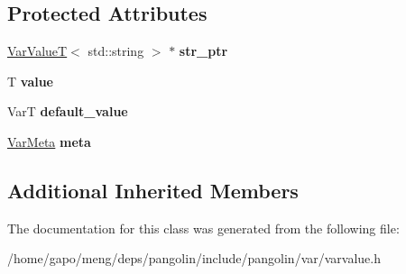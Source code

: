 \subsection*{Protected Attributes}
\begin{DoxyCompactItemize}
\item 
\hyperlink{classpangolin_1_1_var_value_t}{Var\+ValueT}$<$ std\+::string $>$ $\ast$ {\bfseries str\+\_\+ptr}\hypertarget{classpangolin_1_1_var_value_abc50454d6dcea99694ed8c1bfb69d051}{}\label{classpangolin_1_1_var_value_abc50454d6dcea99694ed8c1bfb69d051}

\item 
T {\bfseries value}\hypertarget{classpangolin_1_1_var_value_a51d8e682934a2b0aafc83455c8c7380d}{}\label{classpangolin_1_1_var_value_a51d8e682934a2b0aafc83455c8c7380d}

\item 
VarT {\bfseries default\+\_\+value}\hypertarget{classpangolin_1_1_var_value_a4d3c9a2d886e5d5e1ca5bfa9299847f1}{}\label{classpangolin_1_1_var_value_a4d3c9a2d886e5d5e1ca5bfa9299847f1}

\item 
\hyperlink{structpangolin_1_1_var_meta}{Var\+Meta} {\bfseries meta}\hypertarget{classpangolin_1_1_var_value_adceacf7bc503638cae4cf790d1ab5208}{}\label{classpangolin_1_1_var_value_adceacf7bc503638cae4cf790d1ab5208}

\end{DoxyCompactItemize}
\subsection*{Additional Inherited Members}


The documentation for this class was generated from the following file\+:\begin{DoxyCompactItemize}
\item 
/home/gapo/meng/deps/pangolin/include/pangolin/var/varvalue.\+h\end{DoxyCompactItemize}
